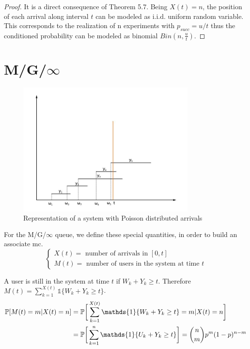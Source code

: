 \begin{proof}
	It is a direct consequence of Theorem 5.7.
	Being $X(t)=n$, the position of each arrival along interval $t$ can be modeled as i.i.d. uniform random variable. This corresponds to the realization of n experiments with $p_{succ}=u/t$ thus the conditioned probability can be modeled as binomial $Bin(n,\frac{u}{t})$.
\end{proof}

\section{M/G/$\infty$}

\begin{figure}[h]
	\centering
	\includegraphics[width=0.8\textwidth]{img/mginf}
	\caption{Representation of a system with Poisson distributed arrivals}
\end{figure}

For the M/G/$\infty$ queue, we define these special quantities, in order to build an associate \gls{mc}.
\begin{equation*}
	\begin{cases}
		X(t) = \text{ number of arrivals in }[ 0, t ] \\
		M(t) = \text{ number of users in the system at time }t
	\end{cases}
\end{equation*}

A user is still in the system at time $t$ if $W_k + Y_k \geq t$. Therefore $M(t) = \sum\limits_{k=1}^{X(t)} \mathds{1}\{W_k + Y_k \geq t\} $.
\begin{equation}
	\begin{split}
		\prob[M(t)=m|X(t)=n] &= \prob\bigg[\sum\limits_{k=1}^{X(t)} \mathds{1}\{W_k + Y_k \geq t\} = m|X(t)=n\bigg] \\
		&= \prob\bigg[\sum\limits_{k=1}^{n} \mathds{1}\{U_k + Y_k \geq t\}\bigg] = {{n}\choose{m}}p^{m}(1-p)^{n-m}
	\end{split}
\end{equation}

